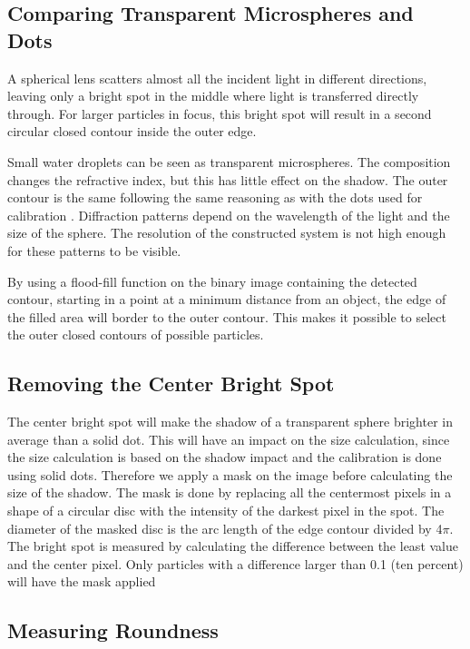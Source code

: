 \subsection{Comparing Transparent Microspheres and Dots}

A spherical lens scatters almost all the incident light in different directions, leaving only a bright spot in the middle where light is transferred directly through. For larger particles in focus, this bright spot will result in a second circular closed contour inside the outer edge. 

Small water droplets can be seen as transparent microspheres. The composition changes the refractive index, but this has little effect on the shadow. The outer contour is the same following the same reasoning as with the dots used for calibration \cite{ryd2015}. Diffraction patterns depend on the wavelength of the light and the size of the sphere. The resolution of the constructed system is not high enough for these patterns to be visible.

By using a flood-fill function on the binary image containing the detected contour, starting in a point at a minimum distance from an object, the edge of the filled area will border to the outer contour. This makes it possible to select the outer closed contours of possible particles.

\subsection{Removing the Center Bright Spot}

The center bright spot will make the shadow of a transparent sphere brighter in average than a solid dot. This will have an impact on the size calculation, since the size calculation is based on the shadow impact and the calibration is done using solid dots. Therefore we apply a mask on the image before calculating the size of the shadow. The mask is done by replacing all the centermost pixels in a shape of a circular disc with the intensity of the darkest pixel in the spot. The diameter of the masked disc is the arc length of the edge contour divided by 4$\pi$. The bright spot is measured by calculating the difference between the least value and the center pixel. Only particles with a difference larger than 0.1 (ten percent) will have the mask applied

\subsection{Measuring Roundness}

